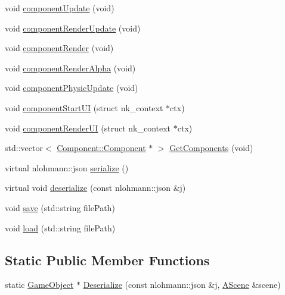 \begin{DoxyCompactItemize}
\item 
void \mbox{\hyperlink{class_beer_engine_1_1_game_object_a91fdf1e47fe0ee4d9fd19c3c0bdbcc19}{component\+Update}} (void)
\item 
void \mbox{\hyperlink{class_beer_engine_1_1_game_object_a9b22312f43b60e3c1171ecd6d5afd09c}{component\+Render\+Update}} (void)
\item 
void \mbox{\hyperlink{class_beer_engine_1_1_game_object_a67e034a0ae38c2f61f7d2c23f104bebc}{component\+Render}} (void)
\item 
void \mbox{\hyperlink{class_beer_engine_1_1_game_object_aa3402c48cb3de30fbb382b57398c58ba}{component\+Render\+Alpha}} (void)
\item 
void \mbox{\hyperlink{class_beer_engine_1_1_game_object_ada13344658678ac8c9c62ea4df5b3ee0}{component\+Physic\+Update}} (void)
\item 
void \mbox{\hyperlink{class_beer_engine_1_1_game_object_aed0ebb4f7e1483594597d4dbea9252cc}{component\+Start\+UI}} (struct nk\+\_\+context $\ast$ctx)
\item 
void \mbox{\hyperlink{class_beer_engine_1_1_game_object_af6dedc2cd23d31e81dc412e8095b28ca}{component\+Render\+UI}} (struct nk\+\_\+context $\ast$ctx)
\item 
std\+::vector$<$ \mbox{\hyperlink{class_beer_engine_1_1_component_1_1_component}{Component\+::\+Component}} $\ast$ $>$ \mbox{\hyperlink{class_beer_engine_1_1_game_object_a090858d4edf1420427cd329688bc2e7c}{Get\+Components}} (void)
\item 
virtual nlohmann\+::json \mbox{\hyperlink{class_beer_engine_1_1_game_object_a4b1436f051194c385b9a82ad8fbb0c5b}{serialize}} ()
\item 
virtual void \mbox{\hyperlink{class_beer_engine_1_1_game_object_a68a7f2c23d06d575e683705195821c87}{deserialize}} (const nlohmann\+::json \&j)
\item 
void \mbox{\hyperlink{class_beer_engine_1_1_game_object_ad30b590f6d7a6556612358e4e14e79df}{save}} (std\+::string file\+Path)
\item 
void \mbox{\hyperlink{class_beer_engine_1_1_game_object_a826c9b7b4077db777e3cf563c1d0328e}{load}} (std\+::string file\+Path)
\end{DoxyCompactItemize}
\subsection*{Static Public Member Functions}
\begin{DoxyCompactItemize}
\item 
static \mbox{\hyperlink{class_beer_engine_1_1_game_object}{Game\+Object}} $\ast$ \mbox{\hyperlink{class_beer_engine_1_1_game_object_a1740ec5a74205514874f21a86c97b148}{Deserialize}} (const nlohmann\+::json \&j, \mbox{\hyperlink{class_beer_engine_1_1_a_scene}{A\+Scene}} \&scene)
\end{DoxyCompactItemize}
